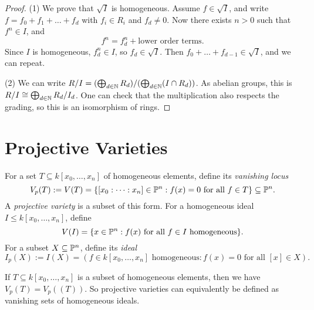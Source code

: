 \begin{proof}
  (1) We prove that $\sqrt{I}$ is
  homogeneous.
  Assume $f \in \sqrt{I}$, and write
  $f = f_0 + f_1 + \dots + f_d$ with
  $f_i \in R_i$ and $f_d \ne 0$. Now
  there exists $n > 0$ such that
  $f^n \in I$, and
  \[
    f^n = f^n_d + \text{lower order terms}.
  \]
  Since $I$ is homogeneous, $f_d^n \in I$,
  so $f_d \in \sqrt{I}$.
  Then $f_0 + \dots + f_{d - 1} \in \sqrt{I}$,
  and we can repeat.

  (2) We can write
  $R / I = (\bigoplus_{d \in \mathbb{N}} R_d) / (\bigoplus_{d \in \mathbb{N}} (I \cap R_d))$.
  As abelian groups, this is
  $R / I \cong \bigoplus_{d \in \mathbb{N}} R_d / I_d$.
  One can check that the multiplication
  also respects the grading, so
  this is an isomorphism of rings.
\end{proof}

\section{Projective Varieties}

\begin{definition}
  For a set $T \subseteq k[x_0, \dots, x_n]$ of
  homogeneous elements, define
  its \emph{vanishing locus}
  \[
    V_p(T) := V(T)
    = \{[x_0 : \dots : x_n] \in \mathbb{P}^n : f(x) = 0 \text{ for all } f \in T\}
    \subseteq \mathbb{P}^n.
  \]
  A \emph{projective variety}
  is a subset of this form.
  For a homogeneous ideal $I \le k[x_0, \dots, x_n]$,
  define
  \[
    V(I) = \{x \in \mathbb{P}^n : f(x) \text{ for all } f \in I \text{ homogeneous}\}.
  \]
  For a subset $X \subseteq \mathbb{P}^n$, define
  its \emph{ideal}
  \[
    I_p(X) := I(X)
    = ( f \in k[x_0, \dots, x_n] \text{ homogeneous} : f(x) = 0 \text{ for all } [x] \in X ).
  \]
\end{definition}

\begin{remark}
  If $T \subseteq k[x_0, \dots, x_n]$
  is a subset of homogeneous elements,
  then we have $V_p(T) = V_p((T))$.
  So projective varieties can
  equivalently be defined as vanishing
  sets of homogeneous ideals.
\end{remark}

